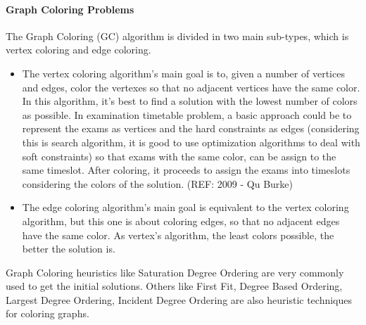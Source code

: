 \paragraph{Graph Coloring Problems}
The Graph Coloring (GC) algorithm is divided in two main sub-types, which is vertex coloring and edge coloring. 
\begin{itemize}
  \item The vertex coloring algorithm's main goal is to, given a number of vertices and edges, color the vertexes so that no adjacent vertices have the same color. In this algorithm, it's best to find a solution with the lowest number of colors as possible. In examination timetable problem, a basic approach could be to represent the exams as vertices and the hard constraints as edges (considering this is search algorithm, it is good to use optimization algorithms to deal with soft constraints) so that exams with the same color, can be assign to the same timeslot. After coloring, it proceeds to assign the exams into timeslots considering the colors of the solution. (REF: 2009 - Qu Burke)
  \item The edge coloring algorithm's main goal is equivalent to the vertex coloring algorithm, but this one is about coloring edges, so that no adjacent edges have the same color. As vertex's algorithm, the least colors possible, the better the solution is.
\end{itemize}

Graph Coloring heuristics like Saturation Degree Ordering are very commonly used to get the initial solutions. Others like First Fit, Degree Based Ordering, Largest Degree Ordering, Incident Degree Ordering are also heuristic techniques for coloring graphs.
\\
